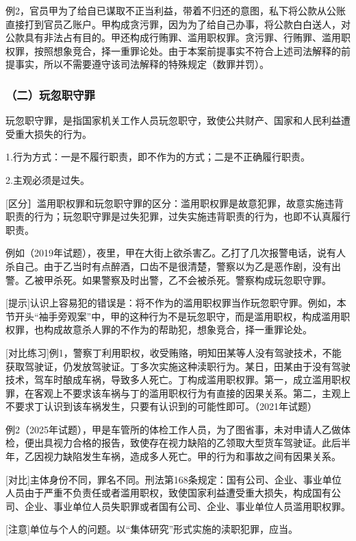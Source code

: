 例2，官员甲为了给自已谋取不正当利益，带着不归还的意图，私下将公款从公账直接打到官员乙账户。甲构成贪污罪，因为为了给自己办事，将公款白白送人，对公款具有非法占有目的。甲还构成行贿罪、滥用职权罪。贪污罪、行贿罪、滥用职权罪，按照想象竞合，择一重罪论处。由于本案前提事实不符合上述司法解释的前提事实，所以不需要遵守该司法解释的特殊规定（数罪并罚）。

\subsubsection*{（二）玩忽职守罪}

玩忽职守罪，是指国家机关工作人员玩忽职守，致使公共财产、国家和人民利益遭受重大损失的行为。

1.行为方式：一是不履行职责，即不作为的方式；二是不正确履行职责。

2.主观必须是过失。

[区分］滥用职权罪和玩忽职守罪的区分：滥用职权罪是故意犯罪，故意实施违背职责的行为；玩忽职守罪是过失犯罪，过失实施违背职责的行为，也即不认真履行职责。

例如（2019年试题），夜里，甲在大街上欲杀害乙。乙打了几次报警电话，说有人杀自己。由于乙当时有点醉酒，口齿不是很清楚，警察以为乙是恶作剧，没有出警。乙被甲杀死。如果警察及时出警，乙不会被杀死。警察构成玩忽职守罪。

[提示]认识上容易犯的错误是：将不作为的滥用职权罪当作玩忽职守罪。例如，本节开头“袖手旁观案”中，甲的这种行为不是玩忽职守，而是滥用职权，构成滥用职权罪，也构成故意杀人罪的不作为的帮助犯，想象竞合，择一重罪论处。

[对比练习]例1，警察丁利用职权，收受贿赂，明知田某等人没有驾驶技术，不能获取驾驶证，仍发放驾驶证。丁多次实施这种渎职行为。某日，田某由于没有驾驶技术，驾车时酿成车祸，导致多人死亡。丁构成滥用职权罪。第一，成立滥用职权罪，在客观上不要求该车祸与丁的滥用职权行为有直接的因果关系。第二，主观上不要求丁认识到该车祸发生，只要有认识到的可能性即可。（2021年试题）

例2（2025年试题），甲是车管所的体检工作人员，为了图省事，未对申请人乙做体检，便出具视力合格的报告，致使存在视力缺陷的乙领取大型货车驾驶证。此后半年，乙因视力缺陷发生车祸，造成多人死亡。甲的行为和事故之间有因果关系。

[对比]主体身份不同，罪名不同。刑法第168条规定：国有公司、企业、事业单位人员由于严重不负责任或者滥用职权，致使国家利益遭受重大损失，构成国有公司、企业、事业单位人员失职罪或者国有公司、企业、事业单位人员滥用职权罪。

[注意]单位与个人的问题。以“集体研究”形式实施的渎职犯罪，应当。

